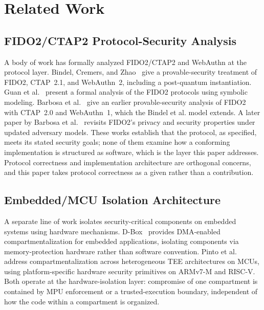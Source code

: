
\section{Related Work}
\label{sec:related}

\subsection{FIDO2/CTAP2 Protocol-Security Analysis}
\label{subsec:related-protocol}

A body of work has formally analyzed FIDO2/CTAP2 and WebAuthn at the protocol layer. Bindel, Cremers, and Zhao~\cite{bindel2023fido2} give a provable-security treatment of FIDO2, CTAP~2.1, and WebAuthn~2, including a post-quantum instantiation. Guan et al.~\cite{guan2022formal} present a formal analysis of the FIDO2 protocols using symbolic modeling. Barbosa et al.~\cite{barbosa-fido2} give an earlier provable-security analysis of FIDO2 with CTAP~2.0 and WebAuthn~1, which the Bindel et al. model extends. A later paper by Barbosa et al.~\cite{popets2025fido2} revisits FIDO2's privacy and security properties under updated adversary models. These works establish that the protocol, as specified, meets its stated security goals; none of them examine how a conforming implementation is structured as software, which is the layer this paper addresses. Protocol correctness and implementation architecture are orthogonal concerns, and this paper takes protocol correctness as a given rather than a contribution.

\subsection{Embedded/MCU Isolation Architecture}
\label{subsec:related-mcu-isolation}

A separate line of work isolates security-critical components on embedded systems using hardware mechanisms. D-Box~\cite{mera2022dbox} provides DMA-enabled compartmentalization for embedded applications, isolating components via memory-protection hardware rather than software convention. Pinto et al.~\cite{tee2024interop} address compartmentalization across heterogeneous TEE architectures on MCUs, using platform-specific hardware security primitives on ARMv7-M and RISC-V. Both operate at the hardware-isolation layer: compromise of one compartment is contained by MPU enforcement or a trusted-execution boundary, independent of how the code within a compartment is organized.

